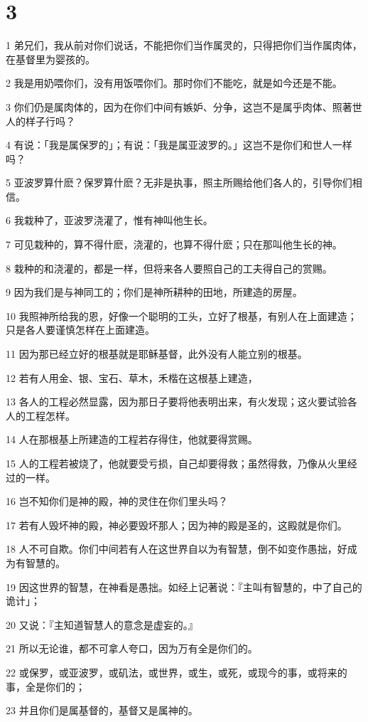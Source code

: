 \chapter{3}

\par 1 弟兄们，我从前对你们说话，不能把你们当作属灵的，只得把你们当作属肉体，在基督里为婴孩的。
\par 2 我是用奶喂你们，没有用饭喂你们。那时你们不能吃，就是如今还是不能。
\par 3 你们仍是属肉体的，因为在你们中间有嫉妒、分争，这岂不是属乎肉体、照著世人的样子行吗？
\par 4 有说：「我是属保罗的」；有说：「我是属亚波罗的。」这岂不是你们和世人一样吗？
\par 5 亚波罗算什麽？保罗算什麽？无非是执事，照主所赐给他们各人的，引导你们相信。
\par 6 我栽种了，亚波罗浇灌了，惟有神叫他生长。
\par 7 可见栽种的，算不得什麽，浇灌的，也算不得什麽；只在那叫他生长的神。
\par 8 栽种的和浇灌的，都是一样，但将来各人要照自己的工夫得自己的赏赐。
\par 9 因为我们是与神同工的；你们是神所耕种的田地，所建造的房屋。
\par 10 我照神所给我的恩，好像一个聪明的工头，立好了根基，有别人在上面建造；只是各人要谨慎怎样在上面建造。
\par 11 因为那已经立好的根基就是耶稣基督，此外没有人能立别的根基。
\par 12 若有人用金、银、宝石、草木，禾楷在这根基上建造，
\par 13 各人的工程必然显露，因为那日子要将他表明出来，有火发现；这火要试验各人的工程怎样。
\par 14 人在那根基上所建造的工程若存得住，他就要得赏赐。
\par 15 人的工程若被烧了，他就要受亏损，自己却要得救；虽然得救，乃像从火里经过的一样。
\par 16 岂不知你们是神的殿，神的灵住在你们里头吗？
\par 17 若有人毁坏神的殿，神必要毁坏那人；因为神的殿是圣的，这殿就是你们。
\par 18 人不可自欺。你们中间若有人在这世界自以为有智慧，倒不如变作愚拙，好成为有智慧的。
\par 19 因这世界的智慧，在神看是愚拙。如经上记著说：『主叫有智慧的，中了自己的诡计」；
\par 20 又说：『主知道智慧人的意念是虚妄的。』
\par 21 所以无论谁，都不可拿人夸口，因为万有全是你们的。
\par 22 或保罗，或亚波罗，或矶法，或世界，或生，或死，或现今的事，或将来的事，全是你们的；
\par 23 并且你们是属基督的，基督又是属神的。

